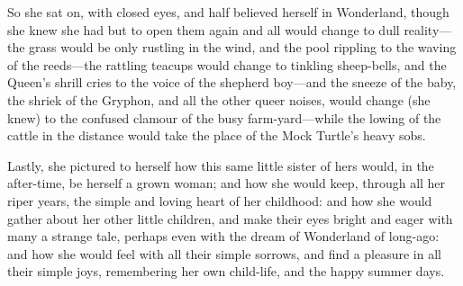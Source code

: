 So she sat on, with closed eyes, and half believed herself in Wonderland, though she knew she had but to open them again and all would change to dull reality—the grass would be only rustling in the wind, and the pool rippling to the waving of the reeds—the rattling teacups would change to tinkling sheep-bells, and the Queen's shrill cries to the voice of the ​shepherd boy—and the sneeze of the baby, the shriek of the Gryphon, and all the other queer noises, would change (she knew) to the confused clamour of the busy farm-yard—while the lowing of the cattle in the distance would take the place of the Mock Turtle's heavy sobs.

Lastly, she pictured to herself how this same little sister of hers would, in the after-time, be herself a grown woman; and how she would keep, through all her riper years, the simple and loving heart of her childhood: and how she would gather about her other little children, and make their eyes bright and eager with many a strange tale, perhaps even with the dream of Wonderland of long-ago: and how she would feel with all their simple sorrows, and find a pleasure in all their simple joys, remembering her own child-life, and the happy summer days.

